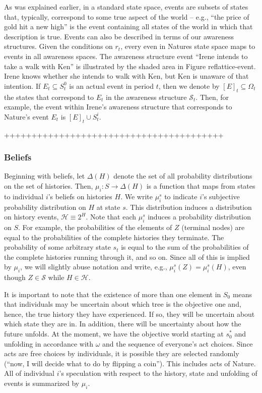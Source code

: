 \documentclass[
11pt,
titlepage,
reqno,
]{article}%
\theoremstyle{definition}
\begin{document}
As was explained earlier, in a standard state space, events are subsets of states that, typically, correspond to some true aspect of the world -- e.g., ``the price of gold hit a new high'' is the event containing all states of the world in which that description is true. 
Events can also be described in terms of our awareness structures.
Given the conditions on $r_t$, every even in Natures state space maps to events in all awareness spaces. 
The awareness structure event ``Irene intends to take a walk with Ken'' is illustrated by the shaded area in Figure ref{lattice-event}.
Irene knows whether she intends to walk with Ken, but Ken is unaware of that intention.
If $E_t\subseteq S^0_t$ is an actual event in period $t$, then we denote by $[E]_t\subseteq \Omega_t$ the states that correspond to $E_t$ in the awareness structure $\mathcal{S}_t$.
Then, for example, the event within Irene's awareness structure that corresponds to Nature's event $E_t$ is $[E]_t\cup S^i_t$.

\clearpage

++++++++++++++++++++++++++++++++++++++++

\subsubsection{Beliefs \label{para: beliefs}}
	Beginning with beliefs, let $\Delta(H)$ denote the set of all probability distributions on the set of histories. 
	Then,  $\mu_i:S\rightarrow \Delta(H)$ is a function that maps from states to individual $i$'s beliefs on histories $H$. 
	We write  $\mu_i^s$ to indicate $i$'s subjective probability distribution on $H$ at state $s$.
	This distribution induces a distribution on history events, $\mathcal{H}\equiv 2^H$. 
	Note that each $\mu_i^s$ induces a probability distribution on $S$.
	For example, the probabilities of the elements of $Z$ (terminal nodes) are equal to the probabilities of the complete histories they terminate. 
	The probability of some arbitrary state $s_t$ is equal to the sum of the probabilities of the complete histories running through it, and so on.
	Since all of this is implied by $\mu_i$, we will slightly abuse notation and write, e.g.,  $\mu_i^s(Z)=\mu_i^s(H)$, even though $Z\in \mathcal{S}$ while $H\in \mathcal{H}$.
	
	It is important to note that the existence of more than one element in $S_0$ means that individuals may be uncertain about which tree is the objective one and, hence, the true history they have experienced. 
	If so, they will be uncertain about which state they are in. 
	In addition, there will be uncertainty about how the future unfolds. 
	At the moment, we have the objective world starting at $s_0^\ast$ and unfolding in accordance with $\omega$ and the sequence of everyone's act choices. 
	Since  acts are free choices by individuals, it is possible they are selected randomly (``now, I will decide what to do by flipping a coin'').
	This includes acts of Nature.
	All of individual $i$'s speculation with respect to the history, state and unfolding of events is summarized by $\mu_i$.
\end{document}
